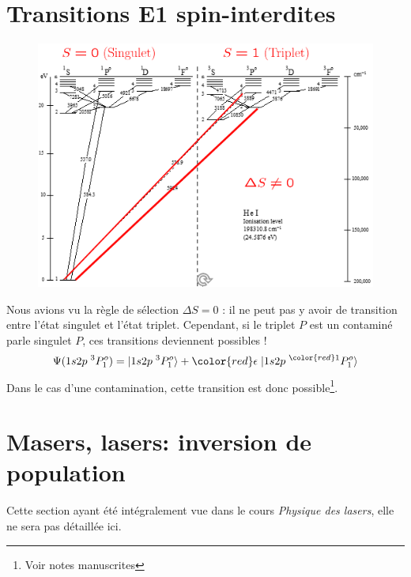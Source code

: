 \section*{Transitions E1 spin-interdites}

	\begin{figure}
	\vspace{-15mm}
	\includegraphics[scale=0.54]{ch2/image6}
	\end{figure}


Nous avions vu la règle de sélection $\Delta S=0$ : il ne peut pas y avoir de transition entre
l'état singulet et l'état triplet. Cependant, si le triplet $P$ est un contaminé parle singulet 
$P$, ces transitions deviennent possibles !
\begin{equation}
\Psi (1s2p \; ^{3} P_1^o  )  = 
\vert  1s2p \; ^{3}P_1^o \rangle +
{\color{red} \epsilon}  \; 
\vert  1s2p \; ^{ {\color{red} 1}  } P_1^o \rangle
\end{equation}
Dans le cas d'une contamination, cette transition est donc possible\footnote{Voir notes manuscrites}.\\




\section{Masers, lasers: inversion de population}
Cette section ayant été intégralement vue dans le cours \textit{Physique des lasers}, elle ne sera
pas détaillée ici.